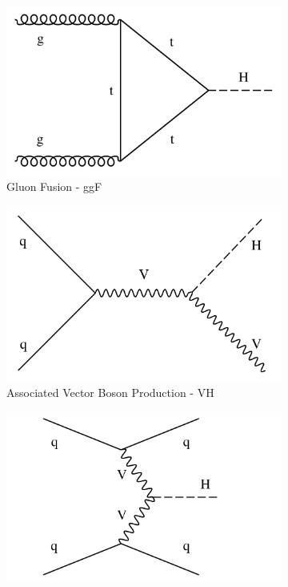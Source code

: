 \begin{figure}[htbp]
  \centering
  \begin{subfigure}[htbp]{0.48\textwidth}
    \centering
    \includegraphics[width=\textwidth]{figures_and_tables/theory/higgs_prod_and_decays/ggf.pdf}
    \caption{Gluon Fusion - ggF}
  \end{subfigure}
  \hfill
  \begin{subfigure}[htbp]{0.48\textwidth}
    \centering
    \includegraphics[width=\textwidth]{figures_and_tables/theory/higgs_prod_and_decays/vh.pdf}
    \caption{Associated Vector Boson Production - VH}
  \end{subfigure}
  \begin{subfigure}[htbp]{0.48\textwidth}
    \centering
    \includegraphics[width=\textwidth]{figures_and_tables/theory/higgs_prod_and_decays/vbf.pdf}

\end{subfigure}
\end{figure}
